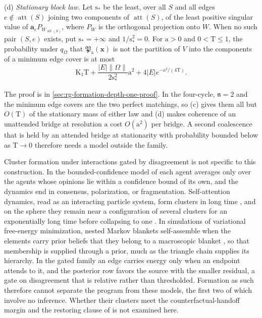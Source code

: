 (d) \emph{Stationary block law.} Let \(\mathrm s_*\) be the least, over all
\(S\) and all edges \(e\notin\operatorname{att}(S)\) joining two components of
\(\operatorname{att}(S)\), of the least positive singular value of
\(\mathbf a_eP_{W_{\operatorname{att}(S)}}\), where \(P_W\) is the orthogonal
projection onto \(W\). When no such pair \((S,e)\) exists, put
\(\mathrm s_*=+\infty\) and \(1/\mathrm s_*^2=0\). For \(\mathrm a>0\) and
\(0<\mathrm T\le1\), the
probability under \(q_\Omega\) that \(\mathfrak P_{\mathrm a}(\mathbf x)\) is
not the partition of \(V\) into the components of a minimum edge cover is at
most
\begin{equation}
\mathrm K_1\mathrm T+\frac{|E|\|\Omega\|}{2\mathrm s_*^2}\mathrm a^2+4|E|e^{-\mathrm a^2/(4\mathrm T)}.
\label{eq:rg-gated-block-law}
\end{equation}

The proof is in \cref{sec:rg-formation-depth-one-proof}. In the four-cycle,
\(\mathfrak n=2\) and the minimum edge covers are the two perfect matchings,
so (c) gives them all but \(O(\mathrm T)\) of the stationary mass of either
law and (d) makes coherence of an unattended bridge at resolution
\(\mathrm a\) cost \(O(\mathrm a^2)\) per bridge. A second coalescence that
is held by an attended bridge at stationarity with probability bounded below
as \(\mathrm T\to0\) therefore needs a model outside the family.

Cluster formation under interactions gated by disagreement is not specific to
this construction. In the bounded-confidence model of
\citet{hegselmann2002opinion} each agent averages only over the agents whose
opinions lie within a confidence bound of its own, and the dynamics end in
consensus, polarization, or fragmentation. Self-attention dynamics, read as an
interacting particle system, form clusters in long time
\citep{geshkovski2023mathematical}, and on the sphere they remain near a
configuration of several clusters for an exponentially long time before
collapsing to one \citep{Geshkovski2024Metastability}. In simulations of
variational free-energy minimization, nested Markov blankets self-assemble when
the elements carry prior beliefs that they belong to a macroscopic blanket
\citep{Palacios2020Hierarchical}, so that membership is supplied through a
prior, much as the triangle chain supplies its hierarchy. In the gated family an
edge carries energy only when an endpoint attends to it, and the posterior row
favors the source with the smaller residual, a gate on disagreement that is
relative rather than thresholded. Formation as such therefore cannot separate
the program from these models, the first two of which involve no inference.
Whether their clusters meet the counterfactual-handoff margin and the restoring
clause of  is not examined here.

